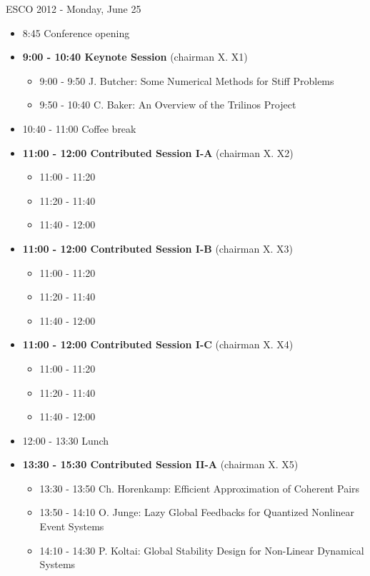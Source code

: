 \documentclass[10pt, A4]{article}%
\begin{document}
\centerline{\huge ESCO 2012 - Monday, June 25}
\vspace{4mm}

\begin{itemize}    
  \item 8:45 Conference opening
  \item {\bf 9:00 - 10:40 Keynote Session} (chairman X. X1) 
  \begin{itemize}
    \item 9:00 - 9:50 J. Butcher: Some Numerical Methods for Stiff Problems
    \item 9:50 - 10:40 C. Baker: An Overview of the Trilinos Project
  \end{itemize}
  \item 10:40 - 11:00 Coffee break
  \item {\bf 11:00 - 12:00 Contributed Session I-A} (chairman X. X2) 
  \begin{itemize}
    \item 11:00 - 11:20 
    \item 11:20 - 11:40 
    \item 11:40 - 12:00 
  \end{itemize}
  \item {\bf 11:00 - 12:00 Contributed Session I-B} (chairman X. X3) 
  \begin{itemize}
    \item 11:00 - 11:20 
    \item 11:20 - 11:40 
    \item 11:40 - 12:00 
  \end{itemize}
  \item {\bf 11:00 - 12:00 Contributed Session I-C} (chairman X. X4) 
  \begin{itemize}
    \item 11:00 - 11:20 
    \item 11:20 - 11:40 
    \item 11:40 - 12:00 
  \end{itemize}
  \item 12:00 - 13:30 Lunch
  \item {\bf 13:30 - 15:30 Contributed Session II-A} (chairman X. X5) 
  \begin{itemize}
    \item 13:30 - 13:50 Ch. Horenkamp: Efficient Approximation of Coherent Pairs
    \item 13:50 - 14:10 O. Junge: Lazy Global Feedbacks for Quantized Nonlinear Event Systems
    \item 14:10 - 14:30 P. Koltai: Global Stability Design for Non-Linear Dynamical Systems

\end{itemize}
\end{itemize}
\end{document}
